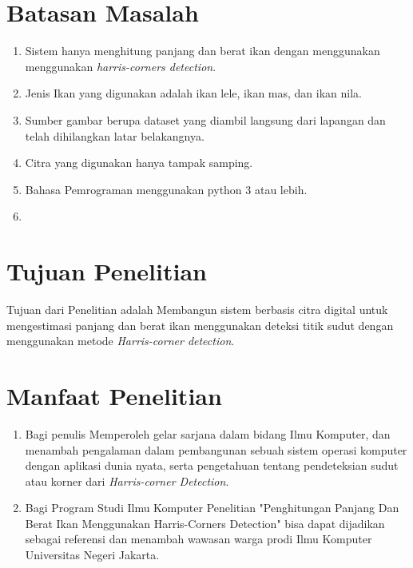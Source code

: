 \section{Batasan Masalah}
\begin{enumerate}
	\item Sistem hanya menghitung panjang dan berat ikan dengan menggunakan menggunakan \emph{harris-corners detection}. 
	\item Jenis Ikan yang digunakan adalah ikan lele, ikan mas, dan ikan nila.
	\item Sumber gambar berupa dataset yang diambil langsung dari lapangan dan telah dihilangkan latar belakangnya.
	\item Citra yang digunakan hanya tampak samping. 
	\item Bahasa Pemrograman menggunakan python 3 atau lebih. 
	\item 
\end{enumerate}
	
\section{Tujuan Penelitian}
	Tujuan dari Penelitian adalah Membangun sistem berbasis citra digital untuk mengestimasi panjang dan berat ikan menggunakan deteksi titik sudut dengan menggunakan metode \emph{Harris-corner detection}. 

\section{Manfaat Penelitian}
\begin{enumerate}
	\item Bagi penulis
	 Memperoleh gelar sarjana dalam bidang Ilmu Komputer, dan menambah pengalaman dalam pembangunan sebuah sistem operasi komputer dengan aplikasi dunia nyata, serta pengetahuan tentang pendeteksian sudut atau korner dari \emph{Harris-corner Detection}. 

		
	\item Bagi Program Studi Ilmu Komputer
	Penelitian "Penghitungan Panjang Dan Berat Ikan Menggunakan Harris-Corners Detection" bisa dapat dijadikan sebagai referensi dan menambah wawasan warga prodi Ilmu Komputer Universitas Negeri Jakarta.
		
\end{enumerate}

\begin{comment}

\end{comment}
